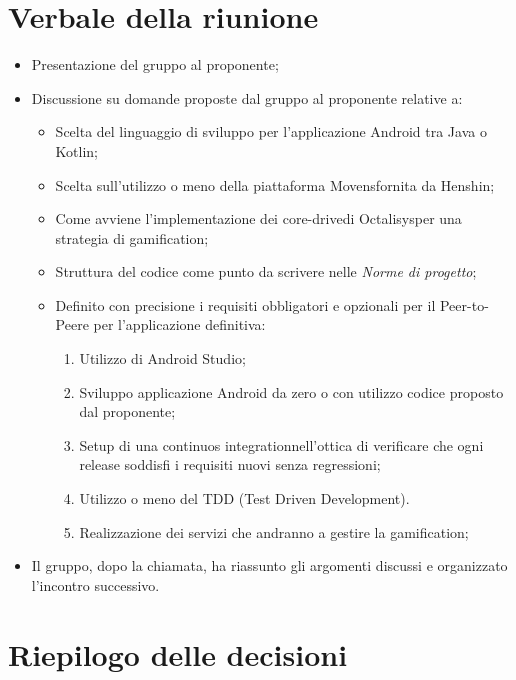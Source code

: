 \section{Verbale della riunione}
\begin{itemize}
	\item Presentazione del gruppo al proponente;
	\item Discussione su domande proposte dal gruppo al proponente relative a:
		\begin{itemize}
			\item Scelta del linguaggio di sviluppo per l'applicazione Android tra Java o Kotlin\glo;
			\item Scelta sull'utilizzo o meno della piattaforma Movens\glosp fornita da Henshin\glo;
			\item Come avviene l'implementazione dei core-drive\glosp di Octalisys\glosp per una strategia di gamification\glo;
			\item Struttura del codice come punto da scrivere nelle \textit{Norme di progetto};
			\item Definito con precisione i requisiti obbligatori e opzionali per il Peer-to-Peer\glosp e per l'applicazione definitiva:
				\begin{enumerate}
					\item Utilizzo di Android Studio;
					\item Sviluppo applicazione Android da zero o con utilizzo codice proposto dal proponente;
					\item Setup di una continuos integration\glosp nell'ottica di verificare che ogni release soddisfi i requisiti nuovi senza regressioni;
					\item Utilizzo o meno del TDD (Test Driven Development).
					\item Realizzazione dei servizi che andranno a gestire la gamification; 
				\end{enumerate}
		\end{itemize}
	\item Il gruppo, dopo la chiamata, ha riassunto gli argomenti discussi e organizzato l'incontro successivo.
\end{itemize} 
\pagebreak
\section{Riepilogo delle decisioni}

	
